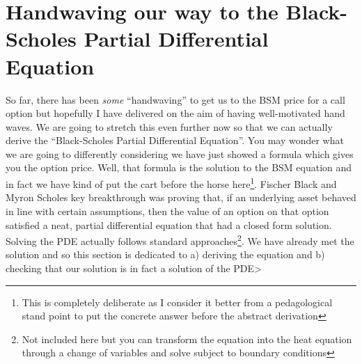 \documentclass[../../Axiomathic.tex]{subfiles}
\begin{document}
\section{Handwaving our way to the Black-Scholes Partial Differential Equation}
So far, there has been \textit{some} ``handwaving'' to get us to the BSM price for a call option but hopefully I have delivered on the aim of having well-motivated hand waves. We are going to stretch this even further now so that we can actually derive the ``Black-Scholes Partial Differential Equation''. You may wonder what we are going to differently considering we have just showed a formula which gives you the option price. Well, that formula is the solution to the BSM equation and in fact we have kind of put the cart before the horse here\footnote{This is completely deliberate as I consider it better from a pedagological stand point to put the concrete answer before the abstract derivation}. Fischer Black and Myron Scholes key breakthrough was proving that, if an underlying asset behaved in line with certain assumptions, then the value of an option on that option satisfied a neat, partial differential equation that had a closed form solution. Solving the PDE actually follows standard approaches\footnote{Not included here but you can transform the equation into the heat equation through a change of variables and solve subject to boundary conditions}. We have already met the solution and so this section is dedicated to a) deriving the equation and b) checking that our solution is in fact a solution of the PDE>
\end{document}

